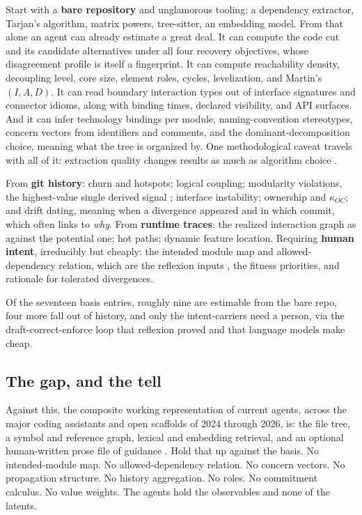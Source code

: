 \documentclass[11pt,oneside]{article}
\theoremstyle{definition}
\begin{document}
Start with a \textbf{bare repository} and unglamorous tooling: a dependency extractor,
Tarjan's algorithm, matrix powers, tree-sitter, an embedding model. From that alone an agent
can already estimate a great deal. It can compute the code cut and its candidate alternatives
under all four recovery objectives, whose disagreement profile is itself a fingerprint. It can
compute reachability density, decoupling level, core size, element roles, cycles, levelization,
and Martin's $(I,A,D)$. It can read boundary interaction types out of interface signatures and
connector idioms, along with binding times, declared visibility, and API surfaces. And it can
infer technology bindings per module, naming-convention stereotypes, concern vectors from
identifiers and comments, and the dominant-decomposition choice, meaning what the tree is
organized by. One methodological caveat travels with all of it: extraction quality changes
results as much as algorithm choice \cite{lutellier2015}.

From \textbf{git history}: churn and hotspots; logical coupling; modularity violations, the
highest-value single derived signal \cite{mo2016}; interface instability; ownership and
$\kappa_{OC}$; and drift dating, meaning when a divergence appeared and in which commit, which
often links to \emph{why}. From \textbf{runtime traces}: the realized interaction graph as
against the potential one; hot paths; dynamic feature location. Requiring \textbf{human
intent}, irreducibly but cheaply: the intended module map and allowed-dependency relation,
which are the reflexion inputs \cite{murphy1995}, the fitness priorities, and rationale for
tolerated divergences.

Of the seventeen basis entries, roughly nine are estimable from the bare repo, four more fall
out of history, and only the intent-carriers need a person, via the draft-correct-enforce loop
that reflexion proved and that language models make cheap.

\subsection{The gap, and the tell}

Against this, the composite working representation of current agents, across the major coding
assistants and open scaffolds of 2024 through 2026, is: the file tree, a symbol and reference
graph, lexical and embedding retrieval, and an optional human-written prose file of guidance
\cite{aider2023,repograph2024}. Hold that up against the basis. No intended-module map. No
allowed-dependency relation. No concern vectors. No propagation structure. No history
aggregation. No roles. No commitment calculus. No value weights. The agents hold the
observables and none of the latents.
\end{document}
